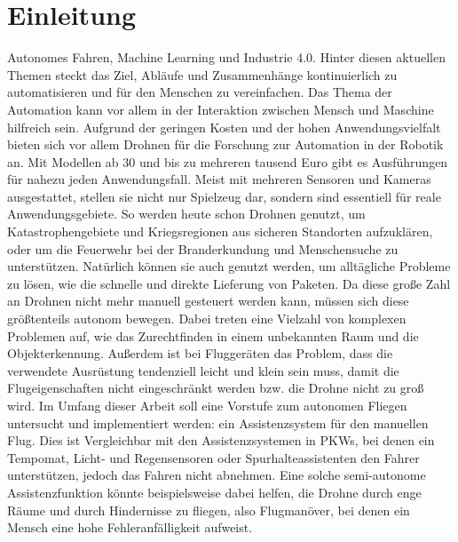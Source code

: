 

\pagestyle{plain}
\chapter{Einleitung}
\label{cha:Introduction}
Autonomes Fahren, Machine Learning und Industrie 4.0. Hinter diesen aktuellen Themen steckt das Ziel, Abläufe und Zusammenhänge kontinuierlich zu automatisieren und für den Menschen zu vereinfachen. Das Thema der Automation kann vor allem in der Interaktion zwischen Mensch und Maschine hilfreich sein. Aufgrund der geringen Kosten und der hohen Anwendungsvielfalt bieten sich vor allem Drohnen für die Forschung zur Automation in der Robotik an. \newline
Mit Modellen ab 30 und bis zu mehreren tausend Euro gibt es Ausführungen für nahezu jeden Anwendungsfall. Meist mit mehreren Sensoren und Kameras ausgestattet, stellen sie nicht nur Spielzeug dar, sondern sind essentiell für reale Anwendungsgebiete. \newline
So werden heute schon Drohnen genutzt, um Katastrophengebiete und Kriegsregionen aus sicheren Standorten aufzuklären, oder um die Feuerwehr bei der Branderkundung und Menschensuche zu unterstützen. \newline
Natürlich können sie auch genutzt werden, um alltägliche Probleme zu lösen, wie die schnelle und direkte Lieferung von Paketen. \newline
Da diese große Zahl an Drohnen nicht mehr manuell gesteuert werden kann, müssen sich diese größtenteils autonom bewegen. Dabei treten eine Vielzahl von komplexen Problemen auf, wie das Zurechtfinden in einem unbekannten Raum und die Objekterkennung. \newline
Außerdem ist bei Fluggeräten das Problem, dass die verwendete Ausrüstung tendenziell leicht und klein sein muss, damit die Flugeigenschaften nicht eingeschränkt werden bzw. die Drohne nicht zu groß wird. \newline
Im Umfang dieser Arbeit soll eine Vorstufe zum autonomen Fliegen untersucht und implementiert werden: ein Assistenzsystem für den manuellen Flug. Dies ist Vergleichbar mit den Assistenzsystemen in PKWs, bei denen ein Tempomat, Licht- und Regensensoren oder Spurhalteassistenten den Fahrer unterstützen, jedoch das Fahren nicht abnehmen. \newline
Eine solche semi-autonome Assistenzfunktion könnte beispielsweise dabei helfen, die Drohne durch enge Räume und durch Hindernisse zu fliegen, also Flugmanöver, bei denen ein Mensch eine hohe Fehleranfälligkeit aufweist. \newline



